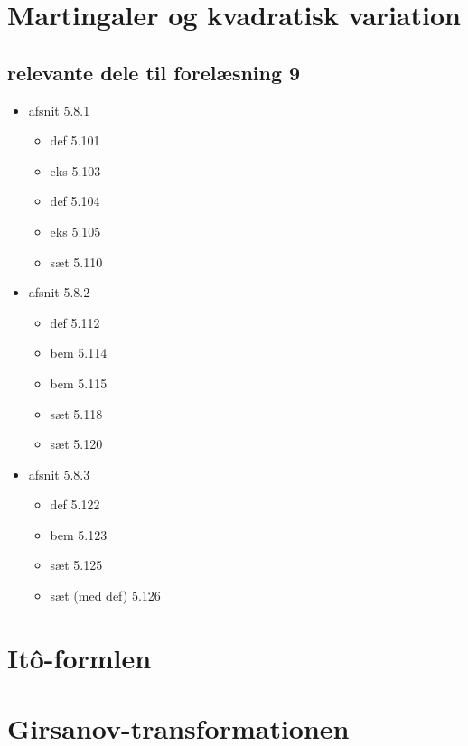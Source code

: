 \documentclass{article}
\numberwithin{equation}{section}
\begin{document}
\newpage

\section{Martingaler og kvadratisk variation}

\subsection*{relevante dele til forelæsning 9}
\begin{itemize}
    \item afsnit 5.8.1
    \begin{itemize}
        \item def 5.101
        \item eks 5.103
        \item def 5.104
        \item eks 5.105
        \item sæt 5.110
    \end{itemize}
    \item afsnit 5.8.2
    \begin{itemize}
        \item def 5.112
        \item bem 5.114
        \item bem 5.115
        \item sæt 5.118
        \item sæt 5.120
    \end{itemize}
    \item afsnit 5.8.3
    \begin{itemize}
        \item def 5.122
        \item bem 5.123
        \item sæt 5.125
        \item sæt (med def) 5.126
    \end{itemize}
\end{itemize}

\newpage

\section{Itô-formlen}

\newpage

\section{Girsanov-transformationen}
\end{document}
